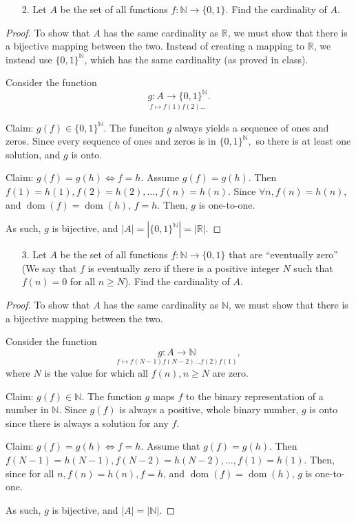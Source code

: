\documentclass[10pt]{article}
\theoremstyle{definition}
\theoremstyle{plain}
\newcommand{\N}{\mathbb{N}}
\newcommand{\R}{\mathbb{R}}
\DeclareMathOperator\dom{dom}
\begin{document}
\pagebreak



\begin{enumerate}
\item[2.] Let $A$ be the set of all functions $f:\N \to \{0,1\}$.  Find the cardinality of $A$.
\end{enumerate}

\begin{proof}
  To show that $A$ has the same cardinality as $\R$, we must show that there is a bijective mapping between the two. Instead of creating a mapping to $\R$, we instead use $\{0,1\}^\N$, which has the same cardinality (as proved in class).

  Consider the function
  $$\underset{f\mapsto f(1)f(2)\dots}{g:A \to \{0,1\}^\N}.$$

  Claim: $g(f)\in\{0,1\}^\N$.
  The funciton $g$ always yields a sequence of ones and zeros. Since every sequence of ones and zeros is in $\{0,1\}^\N,$ so there is at least one solution, and $g$ is onto.

  Claim: $g(f)=g(h) \iff f=h$.
  Assume $g(f)=g(h)$. Then $f(1)=h(1), f(2)=h(2),\dots,f(n)=h(n)$. Since $\forall n, f(n)=h(n)$, and $\dom(f)=\dom(h)$, $f=h$. Then, $g$ is one-to-one.

  As such, $g$ is bijective, and $|A|=|\{0,1\}^\N|=|\R|$.
\end{proof}



\pagebreak



\begin{enumerate}
\item[3.] Let $A$ be the set of all functions $f:\N \to \{0,1\}$ that are ``eventually zero'' (We say that $f$ is eventually zero if there is a positive integer $N$ such that $f(n) = 0$ for all $n \geq N$).  Find the cardinality of $A$.
\end{enumerate}

\begin{proof}
  To show that $A$ has the same cardinality as $\N$, we must show that there is a bijective mapping between the two.

  Consider the function
  $$\underset{f\mapsto f(N-1)f(N-2)\dots f(2)f(1)}{g:A \to \N},$$
  where $N$ is the value for which all $f(n), n\geq N$ are zero.

  Claim: $g(f)\in\N.$
  The function $g$ maps $f$ to the binary representation of a number in $\N$. Since $g(f)$ is always a positive, whole binary number, $g$ is onto since there is always a solution for any $f$.

  Claim: $g(f)=g(h) \iff f=h$.
  Assume that $g(f)=g(h)$. Then $f(N-1) = h(N-1), f(N-2) = h(N-2), \dots, f(1) = h(1)$. Then, since for all $n, f(n)=h(n), f=h$, and $\dom(f)=\dom(h)$, $g$ is one-to-one.

  As such, $g$ is bijective, and $|A|=|\N|$.
\end{proof}
\end{document}
